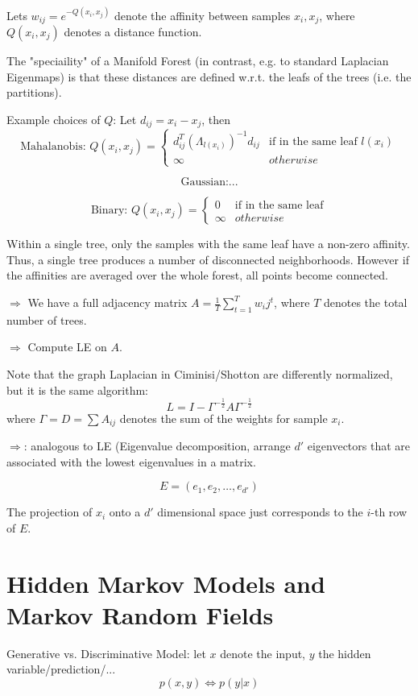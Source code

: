 \documentclass{scrartcl}
\begin{document}
Lets \(w_{ij} = e^{-Q(x_i, x_j)}\) denote the affinity between samples \(x_i,x_j\), where \(Q(x_i, x_j)\) denotes a distance function.

The "speciaility" of a Manifold Forest (in contrast, e.g. to standard Laplacian Eigenmaps) is that these distances are defined w.r.t. the leafs of the trees (i.e. the partitions).

Example choices of \(Q\): Let \(d_{ij} = x_i - x_j\), then
\[\text{Mahalanobis: } Q(x_i, x_j) = \begin{cases} d_{ij}^T(\Lambda_{l(x_i)})^{-1} d_{ij} & \text{if in the same leaf } l(x_i) \\ \infty & otherwise \end{cases}\]

\[\text{Gaussian:} ...\]

\[\text{Binary: } Q(x_i, x_j) = \begin{cases} 0 & \text{if in the same leaf} \\ \infty & otherwise \end{cases}\]

Within a single tree, only the samples with the same leaf have a non-zero affinity. Thus, a single tree produces a number of disconnected neighborhoods.
However if the affinities are averaged over the whole forest, all points become connected.

\(\Rightarrow\) We have a full adjacency matrix \(A = \frac{1}{T} \sum_{t=1}^T w_ij^t\), where \(T\) denotes the total number of trees.

\(\Rightarrow\) Compute LE on \(A\).

Note that the graph Laplacian in Ciminisi/Shotton  are differently normalized, but it is the same algorithm:
\[L = I - \Gamma^{-\frac{1}{2}} A \Gamma^{-\frac{1}{2}}\]
where \(\Gamma = D = \sum A_{ij}\) denotes the sum of the weights for sample \(x_i\).

\(\Rightarrow\): analogous to LE (Eigenvalue decomposition, arrange \(d'\) eigenvectors that are associated with the lowest eigenvalues in a matrix.

\[E = (e_1, e_2, \dots, e_{d'})\]

The projection of \(x_i\) onto a \(d'\) dimensional space just corresponds to the \(i\)-th row of \(E\).



\section{Hidden Markov Models and Markov Random Fields}
Generative vs. Discriminative Model: let \(x\) denote the input, \(y\) the hidden variable/prediction/...
\[p(x,y) \Leftrightarrow p(y|x)\]
\end{document}
